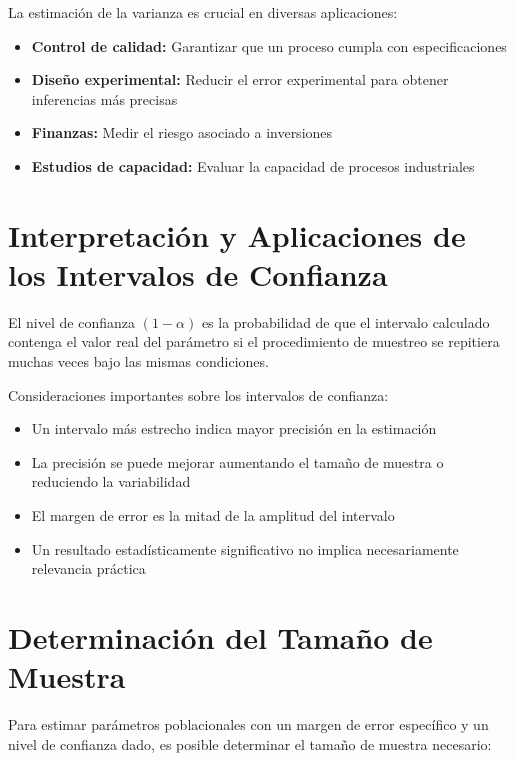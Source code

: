 \begin{remark}
La estimación de la varianza es crucial en diversas aplicaciones:
\begin{itemize}
\item \textbf{Control de calidad:} Garantizar que un proceso cumpla con especificaciones
\item \textbf{Diseño experimental:} Reducir el error experimental para obtener inferencias más precisas
\item \textbf{Finanzas:} Medir el riesgo asociado a inversiones
\item \textbf{Estudios de capacidad:} Evaluar la capacidad de procesos industriales
\end{itemize}
\end{remark}

\section{Interpretación y Aplicaciones de los Intervalos de Confianza}

\begin{definition}
El nivel de confianza $(1-\alpha)$ es la probabilidad de que el intervalo calculado contenga el valor real del parámetro si el procedimiento de muestreo se repitiera muchas veces bajo las mismas condiciones.
\end{definition}

\begin{remark}
Consideraciones importantes sobre los intervalos de confianza:
\begin{itemize}
\item Un intervalo más estrecho indica mayor precisión en la estimación
\item La precisión se puede mejorar aumentando el tamaño de muestra o reduciendo la variabilidad
\item El margen de error es la mitad de la amplitud del intervalo
\item Un resultado estadísticamente significativo no implica necesariamente relevancia práctica
\end{itemize}
\end{remark}

\section{Determinación del Tamaño de Muestra}

Para estimar parámetros poblacionales con un margen de error específico y un nivel de confianza dado, es posible determinar el tamaño de muestra necesario:

